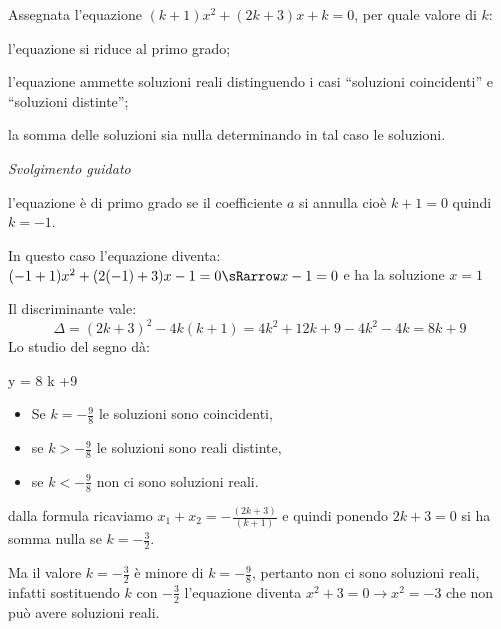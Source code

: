 
\begin{esempio}
Assegnata l'equazione \(( k +1 ) x^2 +( 2 k +3 ) x +k = 0\), per 
quale valore di \(k\):
\begin{enumeratea}
\item l'equazione si riduce al primo grado;
\item l'equazione ammette soluzioni reali distinguendo i casi ``soluzioni 
coincidenti'' e ``soluzioni distinte'';
\item la somma delle soluzioni sia nulla determinando in tal caso le soluzioni.
\end{enumeratea}
\emph{Svolgimento guidato}
\begin{enumeratea}
\item l'equazione è di primo grado se il coefficiente \(a\) si annulla 
cioè \(k +1 = 0\) quindi \(k = -1\). 

In questo caso l'equazione diventa: 
\((-1 +1 ) x^2 +(2(-1) +3 ) x -1 = 0 \sRarrow x -1 = 0\)
e ha la soluzione \(x = 1\)
\item Il discriminante vale:
\[\Delta = (2k +3)^2 -4 k (k +1) = 4 k^2 +12 k +9 -4 k^2 -4 k = 8 k +9\] 
Lo studio del segno dà:

           {y = 8 k +9 \quad \rightarrow}
           {} 

\begin{itemize}
\item Se \(k = -\frac{9}{8}\) le soluzioni sono coincidenti,
\item se \(k > -\frac{9}{8}\) le soluzioni sono reali distinte, 
\item se \(k < -\frac{9}{8}\) non ci sono soluzioni reali.
\end{itemize}

\item dalla formula ricaviamo \(x_1 +x_2 = -\frac{(2k +3 )}{(k +1)}\) 
e quindi ponendo \(2 k +3 = 0\) si ha somma nulla se \(k = -\frac{3}{2}\). 

Ma il valore \(k = -\frac{3}{2}\) è minore di \(k = -\frac{9}{8}\), 
pertanto non ci sono soluzioni reali, infatti sostituendo \(k\) con 
\(-\frac{3}{2}\) l'equazione diventa \(x^2 +3 = 0 \to x^2 = -3\) che non può 
avere soluzioni reali.
\end{enumeratea}
\end{esempio}
